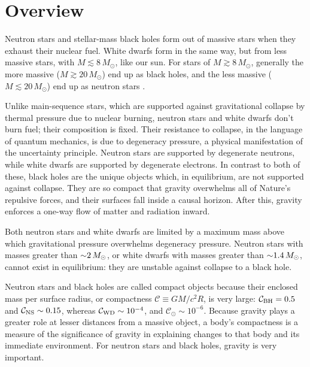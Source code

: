 \chapter{Overview}
\label{chap:overview}

Neutron stars and stellar-mass black holes form out of massive stars when they
exhaust their nuclear fuel. White dwarfs form in the same way, but from less
massive stars, with $M\lesssim 8\,M_{\odot}$, like our sun.
For stars of $M\gtrsim 8\,M_{\odot}$, generally the more massive
($M\gtrsim 20\,M_{\odot}$) end up as black holes, and the less massive
($M\lesssim 20\,M_{\odot}$) end up as neutron stars
\citep{woos2002-review_stellar_evolution}.

Unlike main-sequence stars, which are supported against gravitational collapse
by thermal pressure due to nuclear burning, neutron stars and white dwarfs
don't burn fuel; their composition is fixed.
Their resistance to collapse, in the language of quantum mechanics, is due
to degeneracy pressure, a physical manifestation of the uncertainty principle.
Neutron stars are supported by degenerate neutrons, while white dwarfs are
supported by degenerate electrons. In contrast to both of these, black holes
are the unique objects which, in equilibrium, are not supported against
collapse. They are so compact that gravity overwhelms all of Nature's repulsive
forces, and their surfaces fall inside a causal horizon. After this, gravity
enforces a one-way flow of matter and radiation inward.

Both neutron stars and white dwarfs are limited by a maximum mass above which
gravitational pressure overwhelms degeneracy pressure. Neutron stars with masses
greater than $\mathord{\sim}2\,M_\odot$, or white dwarfs with masses greater than
$\mathord{\sim}1.4\,M_\odot$, cannot exist in equilibrium: they are unstable against
collapse to a black hole.

Neutron stars and black holes are called compact objects because their enclosed
mass per surface radius, or compactness $\mathcal{C}\equiv G M/c^2 R$, is very
large:
$\mathcal{C}_{\rm BH}=0.5$ and
$\mathcal{C}_{\rm NS}\sim0.15$,
whereas $\mathcal{C}_{\rm WD}\sim10^{-4}$, and $\mathcal{C}_{\odot}\sim10^{-6}$.
Because gravity plays a greater role at lesser distances from a massive object,
a body's compactness is a measure of the significance of gravity
in explaining changes to that body and its immediate environment.
For neutron stars and black holes, gravity is very important.

